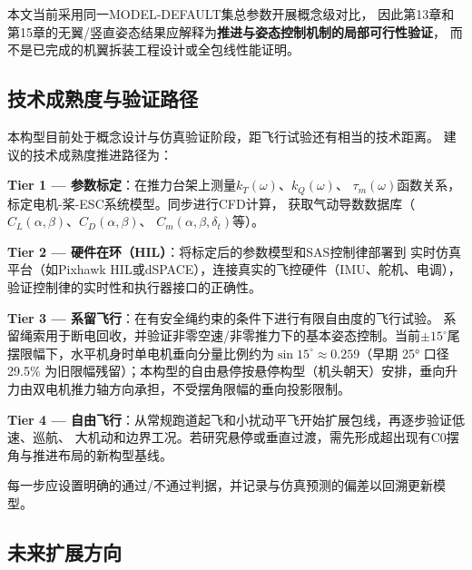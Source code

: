 本文当前采用同一MODEL-DEFAULT集总参数开展概念级对比，
因此第13章和第15章的无翼/竖直姿态结果应解释为\textbf{推进与姿态控制机制的局部可行性验证}，
而不是已完成的机翼拆装工程设计或全包线性能证明。

\subsection{技术成熟度与验证路径}
\label{sec:verification}

本构型目前处于概念设计与仿真验证阶段，距飞行试验还有相当的技术距离。
建议的技术成熟度推进路径为：

\textbf{Tier 1 — 参数标定}：在推力台架上测量$k_T(\omega)$、$k_Q(\omega)$、
$\tau_m(\omega)$函数关系，标定电机-桨-ESC系统模型。同步进行CFD计算，
获取气动导数数据库（$C_L(\alpha,\beta)$、$C_D(\alpha,\beta)$、
$C_m(\alpha,\beta,\delta_t)$等）。

\textbf{Tier 2 — 硬件在环（HIL）}：将标定后的参数模型和SAS控制律部署到
实时仿真平台（如Pixhawk HIL或dSPACE），连接真实的飞控硬件（IMU、舵机、电调），
验证控制律的实时性和执行器接口的正确性。

\textbf{Tier 3 — 系留飞行}：在有安全绳约束的条件下进行有限自由度的飞行试验。
系留绳索用于断电回收，并验证非零空速/非零推力下的基本姿态控制。当前$\pm15^\circ$尾摆限幅下，水平机身时单电机垂向分量比例约为$\sin15^\circ\approx0.259$（早期 25° 口径 29.5\% 为旧限幅残留）；本构型的自由悬停按悬停构型（机头朝天）安排，垂向升力由双电机推力轴方向承担，不受摆角限幅的垂向投影限制。

\textbf{Tier 4 — 自由飞行}：从常规跑道起飞和小扰动平飞开始扩展包线，再逐步验证低速、巡航、
大机动和边界工况。若研究悬停或垂直过渡，需先形成超出现有C0摆角与推进布局的新构型基线。

每一步应设置明确的通过/不通过判据，并记录与仿真预测的偏差以回溯更新模型。

\subsection{未来扩展方向}

